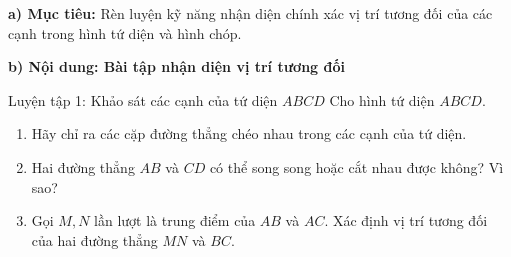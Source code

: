 \documentclass[12pt, a4paper]{article}
\begin{document}
\noindent \textbf{a) Mục tiêu:}
Rèn luyện kỹ năng nhận diện chính xác vị trí tương đối của các cạnh trong hình tứ diện và hình chóp.

\noindent \textbf{b) Nội dung: Bài tập nhận diện vị trí tương đối}
\begin{pedabox}{Luyện tập 1: Khảo sát các cạnh của tứ diện $ABCD$}
Cho hình tứ diện $ABCD$.
\begin{enumerate}[leftmargin=0.6cm]
    \item Hãy chỉ ra các cặp đường thẳng chéo nhau trong các cạnh của tứ diện.
    \item Hai đường thẳng $AB$ và $CD$ có thể song song hoặc cắt nhau được không? Vì sao?
    \item Gọi $M, N$ lần lượt là trung điểm của $AB$ và $AC$. Xác định vị trí tương đối của hai đường thẳng $MN$ và $BC$.
\end{enumerate}
\end{pedabox}
\end{document}
